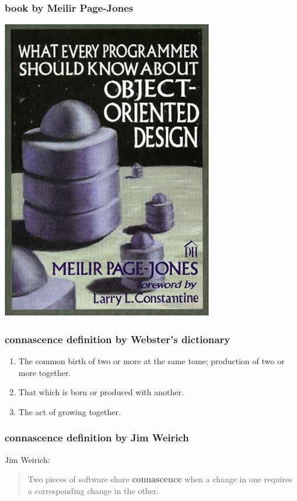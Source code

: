 \documentclass[aspectratio=169,12pt,xcolor=dvipsnames]{beamer}
\begin{document}
\begin{frame}
  \frametitle{book by Meilir Page-Jones}
  \begin{center}
    \includegraphics[height=.8\textheight]{meilir}
  \end{center}
\end{frame}

\begin{frame}
  \frametitle{connascence definition by Webster's dictionary}
  \begin{enumerate}
    \item The common birth of two or more at the same tome; production of two or more together.
    \item That which is born or produced with another.
    \item The act of growing together.
  \end{enumerate}
\end{frame}

\begin{frame}
  \frametitle{connascence definition by Jim Weirich}
  Jim Weirich:\bigskip\\
  \begin{quote}
    Two pieces of software share \textbf{connascence} when a change in one requires a corresponding change in the other.
  \end{quote}
\end{frame}
\end{document}
